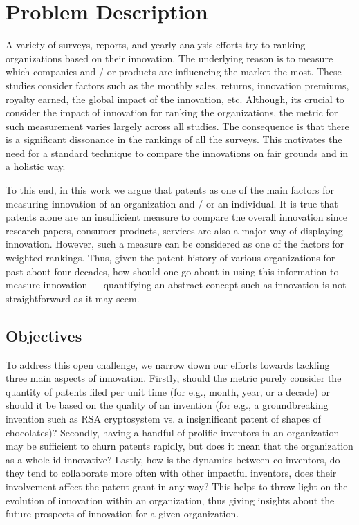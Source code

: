 \section{Problem Description}


A variety of surveys, reports, and yearly analysis efforts try to ranking
organizations  based on their innovation. The underlying reason is to measure
which companies and / or products are influencing the market the most.  These
studies consider factors such as the monthly sales, returns, innovation
premiums, royalty earned, the global impact of the innovation, etc. Although,
its crucial to  consider the impact of innovation for ranking the
organizations, the metric for such measurement  varies largely across all
studies. The consequence is that there is a significant dissonance in the
rankings of all the surveys.  This motivates the need for a standard technique
to compare the innovations on fair grounds and in a holistic way. 

To this end, in this work we argue that patents as one of the main factors for
measuring innovation of an organization and / or an individual. It is true
that patents alone are an insufficient measure to compare the overall
innovation since research papers, consumer products, services are also a major
way of displaying innovation. However, such a measure can be considered as one
of the factors for weighted rankings. Thus, given the patent history of
various organizations for past about four decades,  how should one go about in
using this information to measure innovation --- quantifying an abstract
concept such as innovation is not straightforward as it may seem.  

\subsection{Objectives}

To address this open challenge, we narrow down our efforts towards tackling
three main  aspects of innovation. Firstly, should the metric purely consider
the quantity of patents filed per unit time (for e.g., month, year, or a
decade) or should it be based on the quality of an invention (for e.g., a
groundbreaking invention such as RSA cryptosystem vs. a insignificant patent
of shapes of chocolates)? Secondly, having a handful of prolific inventors in
an organization may be sufficient to churn patents rapidly, but does it mean
that the organization as a whole id innovative? Lastly, how is the dynamics
between co-inventors, do they tend to collaborate more often with other
impactful inventors, does their involvement affect the patent grant in any
way? This helps to throw light on the evolution of innovation within an
organization, thus giving insights about the future prospects of innovation
for a given organization.

